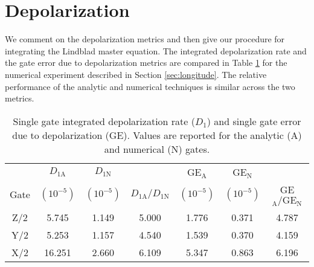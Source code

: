 \section{Depolarization \label{appendix:longitude}}
We comment on the depolarization metrics and then give
our procedure for integrating the Lindblad master equation.
The integrated depolarization rate and the gate error due to
depolarization metrics are compared in Table \ref{tab:longitude} for the
numerical experiment described in Section \ref{sec:longitude}.
The relative performance of the analytic and numerical techniques
is similar across the two metrics.

\begin{table}[ht]
  \begin{tabular}{c | c | c | c | c | c | c}
         & $D_{1\textrm{A}}$ & $D_{1\textrm{N}}$ & & GE$_{\textrm{A}}$ & GE$_{\textrm{N}}$ &\\
    Gate & $(10^{-5})$ & $(10^{-5})$ & $D_{1\textrm{A}}/ D_{1\textrm{N}}$ & $(10^{-5})$ &
    $(10^{-5})$ & GE$_{\textrm{A}} / \textrm{GE}_{\textrm{N}}$\\
    \hline
    Z/2 & 5.745 & 1.149 & 5.000 & 1.776 & 0.371 & 4.787\\
    Y/2 & 5.253 & 1.157 & 4.540 & 1.539 & 0.370 & 4.159\\
    X/2 & 16.251 & 2.660 & 6.109 & 5.347 & 0.863 & 6.196\\
  \end{tabular}
  \caption{
    Single gate integrated depolarization rate ($D_{1}$)
    and single gate error due to depolarization (GE).
    Values are reported for the analytic (A) and numerical (N) gates.
  }
  \label{tab:longitude}
\end{table}

